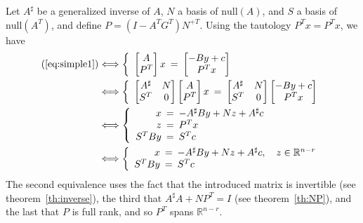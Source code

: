 \documentclass[]{article}
\theoremstyle{definition}
\newcommand{\BIN}{\begin{bmatrix}}
\newcommand{\BOUT}{\end{bmatrix}}
\begin{document}
Let $A^\sharp$ be a generalized inverse of $A$, $N$ a basis of $\mathrm{null}(A)$, and $S$ a basis of $\mathrm{null}(A^T)$, and define $P = (I-A^T G^T) N^{+T}$. Using the tautology $P^T x = P^T x$, we have
\begin{align*}
  \mathrm{(\ref{eq:simple1})} &\Longleftrightarrow 
	\left\{\begin{array}{rcl}
	  \BIN A \\ P^T\BOUT x \hspace{-5pt}&=&\hspace{-5pt} \BIN -By + c \\ P^T x\BOUT
	\end{array}\right.\\
	&\Longleftrightarrow 
	\left\{\begin{array}{rcl}
	  \BIN A^{\sharp} & N \\ S^T & 0 \BOUT \BIN A \\ P^T\BOUT x \hspace{-5pt}&=&\hspace{-5pt} \BIN A^{\sharp} & N \\ S^T & 0 \BOUT \BIN -By + c \\ P^T x\BOUT
	\end{array}\right.\\
	&\Longleftrightarrow 
	\left\{\begin{array}{rcl}
	  x \hspace{-5pt}&=&\hspace{-5pt}  -A^{\sharp}By + N z + A^{\sharp}c \\ 
		z \hspace{-5pt}&=&\hspace{-5pt} P^T x\\
		S^T By \hspace{-5pt}&=&\hspace{-5pt} S^T c
	\end{array}\right.\\
	&\Longleftrightarrow 
	\left\{\begin{array}{rcl}
	  x \hspace{-5pt}&=&\hspace{-5pt}  -A^{\sharp}By + N z + A^{\sharp}c, \quad z \in \mathbb{R}^{n-r} \\ 
		S^T By \hspace{-5pt}&=&\hspace{-5pt} S^T c
	\end{array}\right.
\end{align*}
The second equivalence uses the fact that the introduced matrix is invertible (see theorem~\ref{th:inverse}), the third that $A^{\sharp}A + NP^T = I$ (see theorem~\ref{th:NP}), and the last that $P$ is full rank, and so $P^T$ spans $\mathbb{R}^{n-r}$. 
\end{document}
